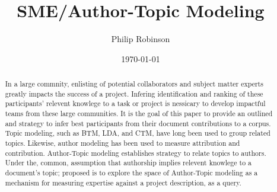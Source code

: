 \documentclass{article}
\title{SME/Author-Topic Modeling}
\date{\today}
\author{Philip Robinson}
\affil{NASA: Jet Propoultion Labratory}
\begin{document}
\maketitle

\begin{abstract}
  In a large commnity, enlisting of potential collaborators and subject matter experts
  greatly impacts the success of a project. Infering identification and ranking of
  these participants' relevent knowlege to a task or project is nessicary to develop
  impactful teams from these large communities\cite{Minto2007}. It is the goal of this
  paper to provide an outlined and strategy to infer best participants from their
  document contributions to a corpus. Topic modeling, such as BTM\cite{Yan2013}, LDA,
  and CTM, have long been used to group related topics\cite{Alghamdi2015}. Likewise,
  author modeling has been used to measure attribution\cite{Rexha2018} and
  contribution\cite{AldebeiHJ016}. Author-Topic modeling establishes strategy to
  relate topics to authors\cite{Rosen-Zvi2004}. Under the, common, assumption that
  authorship implies relevent knowlege to a document's topic; proposed is to explore
  the space of Author-Topic modeling as a mechanism for measuring expertise against a
  project description, as a query.
\end{abstract}

\end{document}
